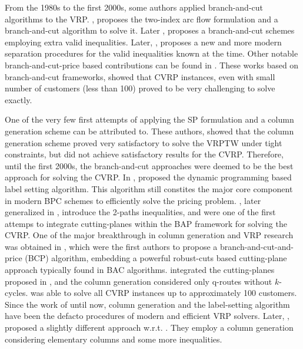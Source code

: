 From the 1980s to the first 2000s, some authors applied branch-and-cut
algorithms to the VRP.
\textcite{laporte1985}, proposes the two-index arc flow formulation
and a branch-and-cut algorithm to solve it.
Later \textcite{augerat1995a}, proposes a branch-and-cut schemes
employing extra valid inequalities.
Later, \textcite{lysgaard2004}, proposes a new and more modern separation procedures for
the valid inequalities known at the time.
Other notable branch-and-cut-price based contributions
can be found in \textcite{araqueg1994, augerat1995, achuthan1996, blasum2000, ralphs2003, achuthan2003, baldacci2004}.
These works based on branch-and-cut frameworks, showed that CVRP instances, even with small number of customers (less than 100) proved
to be very challenging to solve exactly.


One of the very few first attempts of applying
the SP formulation and a column generation scheme can
be attributed to\textcite{desrosiers1984, agarwal1989}.
These authors, showed that the column generation scheme proved
very satisfactory to solve the VRPTW under tight constraints,
but did not achieve satisfactory results for the CVRP.
Therefore, until the first 2000s, the branch-and-cut approaches were
deemed to be the best approach for solving the CVRP.
In \citeyear{desrochers1992}, \citeauthor{desrochers1992} proposed the dynamic programming
based label setting algorithm.
This algorithm still constites the major core component
in modern BPC schemes to efficiently solve the pricing problem.
\textcite{kohl1999}, later generalized in \cite{desaulniers2008}, introduce the
2-paths inequalities, and were one of the first attemps to integrate
cutting-planes within the BAP framework for solving the CVRP.
One of the major breakthrough in column generation and VRP research
was obtained in \textcite{fukasawa2006}, which were the
first authors to propose a branch-and-cut-and-price (BCP) algorithm,
embedding a powerful robust-cuts based cutting-plane approach
typically found in BAC algorithms.
\citeauthor{fukasawa2006} integrated the cutting-planes proposed in \cite{lysgaard2004},
and the column generation considered only q-routes without $k$-cycles.
\textcite{fukasawa2006} was able to solve all CVRP instances up to approximately 100 customers.
Since the work of \citeauthor{fukasawa2006} until now, column generation
and the label-setting algorithm have been the defacto procedures
of modern and efficient VRP solvers.
Later, \textcite{baldacci2008}, proposed a slightly different approach w.r.t. \citeauthor{fukasawa2006}.
They employ a column generation considering elementary columns and some more inequalities.
